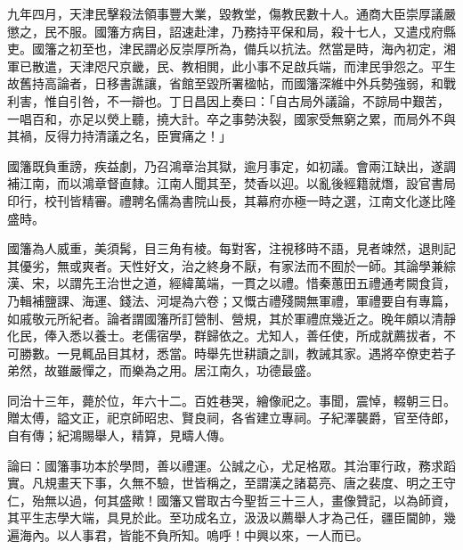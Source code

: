 \begin{pinyinscope}
九年四月，天津民擊殺法領事豐大業，毀教堂，傷教民數十人。通商大臣崇厚議嚴懲之，民不服。國籓方病目，詔速赴津，乃務持平保和局，殺十七人，又遣戍府縣吏。國籓之初至也，津民謂必反崇厚所為，備兵以抗法。然當是時，海內初定，湘軍已散遣，天津咫尺京畿，民、教相閧，此小事不足啟兵端，而津民爭怨之。平生故舊持高論者，日移書譙讓，省館至毀所署楹帖，而國籓深維中外兵勢強弱，和戰利害，惟自引咎，不一辯也。丁日昌因上奏曰：「自古局外議論，不諒局中艱苦，一唱百和，亦足以熒上聽，撓大計。卒之事勢決裂，國家受無窮之累，而局外不與其禍，反得力持清議之名，臣實痛之！」

國籓既負重謗，疾益劇，乃召鴻章治其獄，逾月事定，如初議。會兩江缺出，遂調補江南，而以鴻章督直隸。江南人聞其至，焚香以迎。以亂後經籍就熸，設官書局印行，校刊皆精審。禮聘名儒為書院山長，其幕府亦極一時之選，江南文化遂比隆盛時。

國籓為人威重，美須髯，目三角有棱。每對客，注視移時不語，見者竦然，退則記其優劣，無或爽者。天性好文，治之終身不厭，有家法而不囿於一師。其論學兼綜漢、宋，以謂先王治世之道，經緯萬端，一貫之以禮。惜秦蕙田五禮通考闕食貨，乃輯補鹽課、海運、錢法、河堤為六卷；又慨古禮殘闕無軍禮，軍禮要自有專篇，如戚敬元所紀者。論者謂國籓所訂營制、營規，其於軍禮庶幾近之。晚年頗以清靜化民，俸入悉以養士。老儒宿學，群歸依之。尤知人，善任使，所成就薦拔者，不可勝數。一見輒品目其材，悉當。時舉先世耕讀之訓，教誡其家。遇將卒僚吏若子弟然，故雖嚴憚之，而樂為之用。居江南久，功德最盛。

同治十三年，薨於位，年六十二。百姓巷哭，繪像祀之。事聞，震悼，輟朝三日。贈太傅，謚文正，祀京師昭忠、賢良祠，各省建立專祠。子紀澤襲爵，官至侍郎，自有傳；紀鴻賜舉人，精算，見疇人傳。

論曰：國籓事功本於學問，善以禮運。公誠之心，尤足格眾。其治軍行政，務求蹈實。凡規畫天下事，久無不驗，世皆稱之，至謂漢之諸葛亮、唐之裴度、明之王守仁，殆無以過，何其盛歟！國籓又嘗取古今聖哲三十三人，畫像贊記，以為師資，其平生志學大端，具見於此。至功成名立，汲汲以薦舉人才為己任，疆臣閫帥，幾遍海內。以人事君，皆能不負所知。嗚呼！中興以來，一人而已。


\end{pinyinscope}